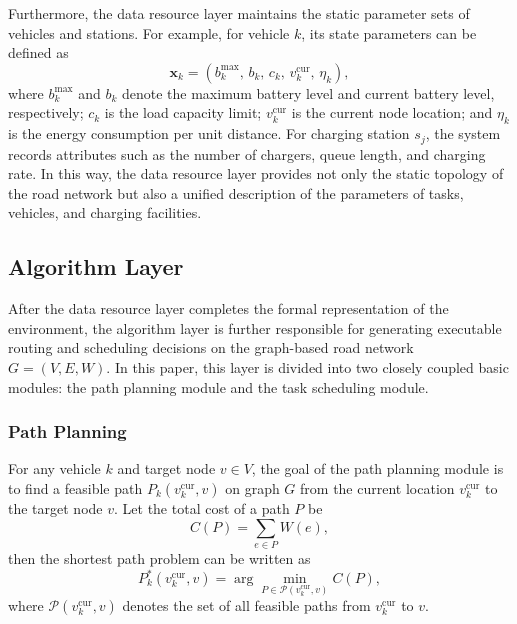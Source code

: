 Furthermore, the data resource layer maintains the static parameter sets of vehicles and stations. For example, for vehicle \(k\), its state parameters can be defined as
\[
\mathbf{x}_k=(b_k^{\max},\, b_k,\, c_k,\, v_k^{\text{cur}},\, \eta_k),
\]
where \(b_k^{\max}\) and \(b_k\) denote the maximum battery level and current battery level, respectively; \(c_k\) is the load capacity limit; \(v_k^{\text{cur}}\) is the current node location; and \(\eta_k\) is the energy consumption per unit distance. For charging station \(s_j\), the system records attributes such as the number of chargers, queue length, and charging rate. In this way, the data resource layer provides not only the static topology of the road network but also a unified description of the parameters of tasks, vehicles, and charging facilities.



\subsection{Algorithm Layer}
After the data resource layer completes the formal representation of the environment, the algorithm layer is further responsible for generating executable routing and scheduling decisions on the graph-based road network \(G=(V,E,W)\). In this paper, this layer is divided into two closely coupled basic modules: the path planning module and the task scheduling module.
\subsubsection{Path Planning}
For any vehicle \(k\) and target node \(v\in V\), the goal of the path planning module is to find a feasible path \(P_k(v_k^{\text{cur}}, v)\) on graph \(G\) from the current location \(v_k^{\text{cur}}\) to the target node \(v\). Let the total cost of a path \(P\) be
\[
C(P)=\sum_{e\in P} W(e),
\]
then the shortest path problem can be written as
\[
P_k^*(v_k^{\text{cur}}, v)=\arg\min_{P\in \mathcal{P}(v_k^{\text{cur}}, v)} C(P),
\]
where \(\mathcal{P}(v_k^{\text{cur}}, v)\) denotes the set of all feasible paths from \(v_k^{\text{cur}}\) to \(v\).

